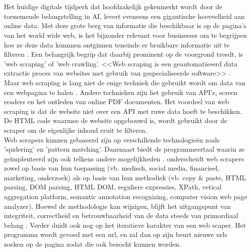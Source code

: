 \chapter{}%
\label{ch:stand-van-zaken}


Het huidige digitale tijdperk dat hoofdzakelijk gekenmerkt wordt door de toenemende belangstelling in AI, levert eveneens een gigantische hoeveelheid aan online data. Met deze grote berg van informatie die beschikbaar is op de pagina's van het world wide web, is het bijzonder relevant voor businesses om te begrijpen hoe ze deze data kunnnen ontginnen teneinde er bruikbare informatie uit te filteren \autocite{Lotfi2021}. Een belangrijk begrip dat daarbij prominent op de voorgrond treedt, is 'web scraping' of 'web crawling'. <<Web scraping is een geautomatiseerd data extractie proces van websites met gebruik van gespecialiseerde software>> \textcite{Bhatt2023}. Maar web scraping is lang niet de enige techniek die gebruikt wordt om data van een webpagina te halen \autocite{Gray2012}. Andere technieken zijn het gebruik van API's, screen readers en het ontleden van online PDF documenten. Het voordeel van web scraping is dat de website niet over een API met ruwe data hoeft te beschikken. De HTML code waarmee de website opgebouwd is, wordt gebruikt door de scraper om de eigenlijke inhoud eruit te filteren.\\
Web scrapers kunnen gebaseerd zijn op verschillende technologieën zoals 'spidering' en 'pattern matching'. Daarnaast biedt de programmeertaal waarin ze geïmplenteerd zijn ook telkens andere mogelijkheden \autocite{Bhatt2023}.
\textcite{Lotfi2021} onderscheidt web scrapers zowel op basis van hun toepassing (vb. medisch, social media, financieel, marketing, onderzoek) als op basis van hun  methodiek (vb. copy \& paste, HTML parsing, DOM parsing, HTML DOM, reguliere expressies, XPath, vetical aggregation platform, semantic annotation recognizing, computer vision web page analyzer). Hoewel de methodologie kan wijzigen, blijft het uitgangspunt van integriteit, correctheid en betrouwbaarheid van de data steeds van primordiaal belang \autocite{Lotfi2021}.
Verder duidt \textcite{Lotfi2021} ook nog op het iteratieve karakter van een web scaper. Het programma wordt gevoed met een url, en zal dan op zijn beurt nieuwe urls zoeken op de pagina zodat die ook bezocht kunnen worden.\\
